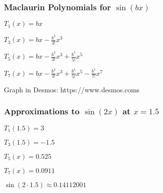 \documentclass{beamer}
\begin{document}
\begin{frame}
\frametitle{Maclaurin Polynomials for $\sin(bx)$}


$\displaystyle T_1(x) =bx$ \newline
\vspace{0.2 cm}

$\displaystyle T_3(x) = bx-\frac{b^3}{3!}x^3 $ \newline
\vspace{0.2 cm}

$\displaystyle T_5(x) =bx-\frac{b^3}{3!}x^3 + \frac{b^5}{5!}x^5 $ \newline

\vspace{0.2 cm}

$\displaystyle T_7(x) =bx-\frac{b^3}{3!}x^3 + \frac{b^5}{5!}x^5  - \frac{b^7}{7!}x^7$ \newline

\vspace{0.6cm}

Graph in Desmos: https://www.desmos.coms

\vspace{6.5 cm}
\end{frame}



\begin{frame}
\frametitle{Approximations to $\sin(2x)$ at $x = 1.5$}

$\displaystyle T_1(1.5) = 3$ \newline
\vspace{0.2 cm}

$\displaystyle T_3(1.5) = -1.5 $ \newline
\vspace{0.2 cm}

$\displaystyle T_5(x) =0.525 $ \newline

\vspace{0.2 cm}

$\displaystyle T_7(x) =0.0911$ \newline

\vspace{0.6cm}

\vspace{1 cm}

$\sin(2 \cdot 1.5) \approx 0.14112001$

\vspace{6.5 cm}
\end{frame}
\end{document}
